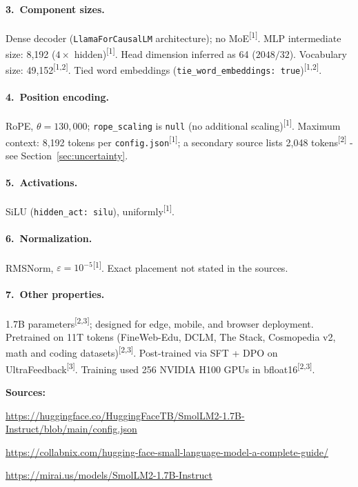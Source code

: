 \documentclass[11pt, a4paper]{article}
\newcommand{\src}[1]{\textsuperscript{\normalfont\small[#1]}}
\begin{document}
\paragraph{3.~Component sizes.}
Dense decoder (\texttt{LlamaForCausalLM} architecture); no MoE\src{1}.
MLP intermediate size: 8,192 ($4\times$ hidden)\src{1}.
Head dimension inferred as 64 ($2048/32$).
Vocabulary size: 49,152\src{1,2}.
Tied word embeddings (\texttt{tie\_word\_embeddings: true})\src{1,2}.

\paragraph{4.~Position encoding.}
RoPE, $\theta=130{,}000$; \texttt{rope\_scaling} is \texttt{null} (no additional
scaling)\src{1}.
Maximum context: 8,192 tokens per \texttt{config.json}\src{1};
a secondary source lists 2,048 tokens\src{2} - see Section~\ref{sec:uncertainty}.

\paragraph{5.~Activations.}
SiLU (\texttt{hidden\_act: silu}), uniformly\src{1}.

\paragraph{6.~Normalization.}
RMSNorm, $\varepsilon=10^{-5}$\src{1}.
Exact placement not stated in the sources.

\paragraph{7.~Other properties.}
1.7B parameters\src{2,3}; designed for edge, mobile, and browser deployment.
Pretrained on 11T tokens (FineWeb-Edu, DCLM, The Stack, Cosmopedia v2, math
and coding datasets)\src{2,3}.
Post-trained via SFT + DPO on UltraFeedback\src{3}.
Training used 256 NVIDIA H100 GPUs in bfloat16\src{2,3}.

\noindent\textbf{Sources:}
\begin{enumerate}[noitemsep,label=\small{[\arabic*]},leftmargin=*,topsep=2pt]
\item \small\url{https://huggingface.co/HuggingFaceTB/SmolLM2-1.7B-Instruct/blob/main/config.json}
\item \small\url{https://collabnix.com/hugging-face-small-language-model-a-complete-guide/}
\item \small\url{https://mirai.us/models/SmolLM2-1.7B-Instruct}
\end{enumerate}
\end{document}
